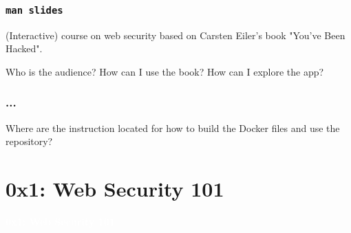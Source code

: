 \documentclass[aspectratio=169]{beamer}
\begin{document}
\begin{frame}
    \frametitle{\texttt{man slides}}

    (Interactive) course on web security based on Carsten Eiler's book "You've Been Hacked".
    
    Who is the audience? How can I use the book? How can I explore the app?
\end{frame}

\begin{frame}
    \frametitle{...}
    Where are the instruction located for how to build the Docker files and use the repository?
\end{frame}

\section{0x1: Web Security 101}

{
\begin{frame}
\huge{\textcolor{white}{\textbf{0x1: Web Security 101}}}
\end{frame}
}
\end{document}
